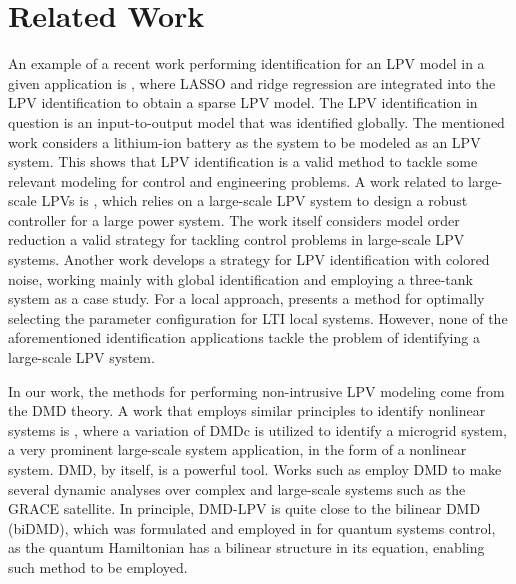
\section{Related Work} \label{sec:rel_work} 

An example of a recent work performing identification for an LPV model in a given application is \cite{Sheikh2024}, where LASSO and ridge regression are integrated into the LPV identification to obtain a sparse LPV model.
%
The LPV identification in question is an input-to-output model that was identified globally. The mentioned work considers a lithium-ion battery as the system to be modeled as an LPV system.
%
This shows that LPV identification is a valid method to tackle some relevant modeling for control and engineering problems.
%
A work related to large-scale LPVs is \cite{Dehghani2024}, which relies on a large-scale LPV system to design a robust controller for a large power system.
%
The work itself considers model order reduction a valid strategy for tackling control problems in large-scale LPV systems.
%
Another work \cite{Liu2024} develops a strategy for LPV identification with colored noise, working mainly with global identification and employing a three-tank system as a case study.
%
For a local approach, \cite{Bombois2021} presents a method for optimally selecting the parameter configuration for LTI local systems.
%
However, none of the aforementioned identification applications tackle the problem of identifying a large-scale LPV system.


%
In our work, the methods for performing non-intrusive LPV modeling come from the DMD theory.
%
A work that employs similar principles to identify nonlinear systems is \cite{Jiang2024}, where a variation of DMDc is utilized to identify a microgrid system, a very prominent large-scale system application, in the form of a nonlinear system.
%
DMD, by itself, is a powerful tool.
%
Works such as \cite{Libero2024} employ DMD to make several dynamic analyses over complex and large-scale systems such as the GRACE satellite.
%
In principle, DMD-LPV is quite close to the bilinear DMD (biDMD), which was formulated and employed in \cite{Goldschmidt2021} for quantum systems control, as the quantum Hamiltonian has a bilinear structure in its equation, enabling such method to be employed.


